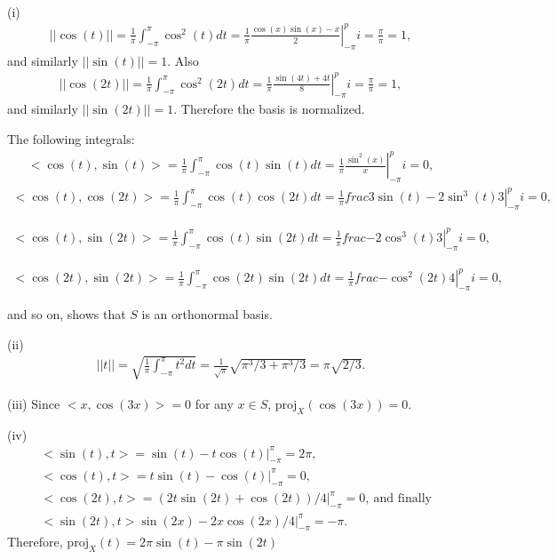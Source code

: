 \documentclass[letterpaper,12pt]{article}
\theoremstyle{definition}
\newenvironment{problem}[2][Problem]{\begin{trivlist}
\item[\hskip \labelsep {\bfseries #1}\hskip \labelsep {\bfseries #2.}]}{\end{trivlist}}
\begin{document}
\begin{problem}8~\\
(i)
\begin{align*}
    ||\cos(t)||=\frac{1}{\pi}\int_{-\pi}^\pi\cos^2(t)dt=
    \frac{1}{\pi}\left.\frac{\cos(x)\sin(x)-x}{2}\right\lvert_{-\pi}^pi=\frac{\pi}{\pi}=1,
\end{align*}
and similarly $||\sin(t)||=1$.
Also
\begin{align*}
    ||\cos(2t)||=\frac{1}{\pi}\int_{-\pi}^\pi\cos^2(2t)dt=
    \frac{1}{\pi}\left.\frac{\sin(4t)+4t}{8}\right\lvert_{-\pi}^pi=\frac{\pi}{\pi}=1,
\end{align*}
and similarly $||\sin(2t)||=1$.
Therefore the basis is normalized.

The following integrals:
\begin{align*}
    <\cos(t),\sin(t)> = \frac{1}{\pi}\int_{-\pi}^\pi\cos(t)\sin(t)dt=
    \frac{1}{\pi}\left.\frac{\sin^2(x)}{x}\right\lvert_{-\pi}^pi=0,
\end{align*}
\begin{align*}
    <\cos(t),\cos(2t)> = \frac{1}{\pi}\int_{-\pi}^\pi\cos(t)\cos(2t)dt=
    \frac{1}{\pi}\left.frac{3\sin(t)-2\sin^3(t)}{3}\right\lvert_{-\pi}^pi=0,
\end{align*}

\begin{align*}
    <\cos(t),\sin(2t)> = \frac{1}{\pi}\int_{-\pi}^\pi\cos(t)\sin(2t)dt=
    \frac{1}{\pi}\left.frac{-2\cos^3(t)}{3}\right\lvert_{-\pi}^pi=0,
\end{align*}

\begin{align*}
    <\cos(2t),\sin(2t)> = \frac{1}{\pi}\int_{-\pi}^\pi\cos(2t)\sin(2t)dt=
    \frac{1}{\pi}\left.frac{-\cos^2(2t)}{4}\right\lvert_{-\pi}^pi=0,
\end{align*}

and so on, shows that $S$ is an orthonormal basis.

(ii)
\begin{align*}
    ||t|| = \sqrt{\frac{1}{\pi}\int_{-\pi}^\pi t^2dt}=
    \frac{1}{\sqrt{\pi}}\sqrt{\pi^3/3+\pi^3/3}=
    \pi\sqrt{2/3}.
\end{align*}

(iii)
Since $<x,\cos(3x)>=0$ for any $x\in S$, $\text{proj}_X(\cos(3x))=0$.

(iv)
\begin{align*}
    &<\sin(t),t>=\sin(t)-t\cos(t)\lvert_{-\pi}^\pi=2\pi,\\
    &<\cos(t),t>=t\sin(t)-\cos(t)\lvert_{-\pi}^\pi=0,\\
    &<\cos(2t),t>=(2t\sin(2t)+\cos(2t))/4\lvert_{-\pi}^\pi=0,\ \text{and finally}\\
    &<\sin(2t),t>\sin\left(2x\right)-2x\cos\left(2x\right)/4\lvert_{-\pi}^\pi=-\pi.
\end{align*}
Therefore, $\text{proj}_X(t)=2\pi\sin(t)-\pi\sin(2t)$

\end{problem}
\end{document}
